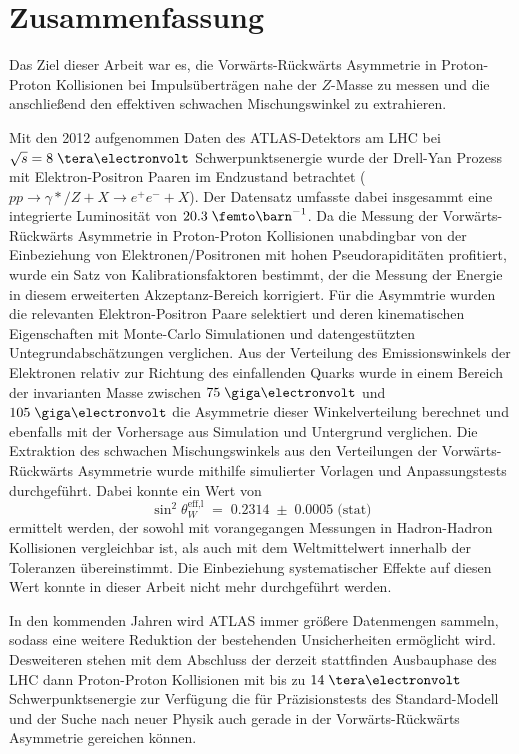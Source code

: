 

\chapter{Zusammenfassung}
\label{summary}

Das Ziel dieser Arbeit war es, die Vorwärts-Rückwärts Asymmetrie in
Proton-Proton Kollisionen bei Impulsüberträgen nahe der $Z$-Masse zu messen und
die anschließend den effektiven schwachen Mischungswinkel zu extrahieren.

Mit den 2012 aufgenommen Daten des ATLAS-Detektors am LHC bei $\sqrt{s}=8\TeV$
Schwerpunktsenergie wurde der Drell-Yan Prozess mit Elektron-Positron Paaren im
Endzustand betrachtet ($pp\rightarrow \gamma*/Z +X \rightarrow e^+e^-+X$). Der
Datensatz umfasste dabei insgesammt eine integrierte Luminosität von
$20.3\fb^{-1}$. Da die Messung der Vorwärts-Rückwärts Asymmetrie in
Proton-Proton Kollisionen unabdingbar von der Einbeziehung von
Elektronen/Positronen mit hohen Pseudorapiditäten profitiert, wurde ein Satz
von Kalibrationsfaktoren bestimmt, der die Messung der Energie in diesem
erweiterten Akzeptanz-Bereich korrigiert. Für die Asymmtrie wurden die
relevanten Elektron-Positron Paare selektiert und deren kinematischen
Eigenschaften mit Monte-Carlo Simulationen und datengestützten
Untegrundabschätzungen verglichen. Aus der Verteilung des Emissionswinkels der
Elektronen relativ zur Richtung des einfallenden Quarks wurde in einem Bereich
der invarianten Masse zwischen $75\GeV$ und $105\GeV$ die Asymmetrie dieser
Winkelverteilung berechnet und ebenfalls mit der Vorhersage aus Simulation und
Untergrund verglichen. Die Extraktion des schwachen Mischungswinkels aus den
Verteilungen der Vorwärts-Rückwärts Asymmetrie wurde mithilfe simulierter
Vorlagen  und Anpassungstests durchgeführt. Dabei konnte ein Wert von 
\begin{equation*}
    \sin^2\theta_W^\text{eff,l} \;=\; 0.2314
        \;\pm\; 0.0005 \;\text{(stat)}
\end{equation*}
ermittelt werden, der sowohl mit vorangegangen Messungen in Hadron-Hadron
Kollisionen vergleichbar ist, als auch mit dem Weltmittelwert innerhalb der
Toleranzen übereinstimmt. Die Einbeziehung systematischer Effekte auf diesen
Wert konnte in dieser Arbeit nicht mehr durchgeführt werden.

In den kommenden Jahren wird ATLAS immer größere Datenmengen sammeln, sodass
eine weitere Reduktion der bestehenden Unsicherheiten ermöglicht wird.
Desweiteren stehen mit dem Abschluss der derzeit stattfinden Ausbauphase des
\ac{LHC} dann Proton-Proton Kollisionen mit bis zu $14\TeV$ Schwerpunktsenergie
zur Verfügung die für Präzisionstests des Standard-Modell und der Suche nach
neuer Physik auch gerade in der Vorwärts-Rückwärts Asymmetrie gereichen können. 

